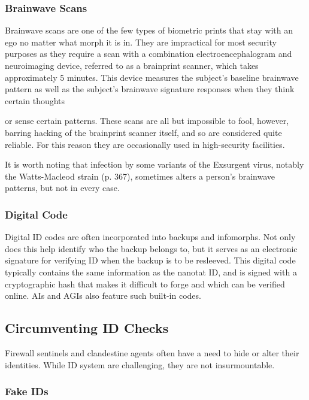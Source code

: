 \subsubsection{Brainwave Scans} 

Brainwave scans are one of the few types of biometric prints that stay with an ego no matter what morph it is in. They are impractical for most security purposes as they require a scan with a combination electroencephalogram and neuroimaging device, referred to as a brainprint scanner, which takes approximately 5 minutes. This device measures the subject's baseline brainwave pattern as well as the subject's brainwave signature responses when they think certain thoughts 

or sense certain patterns. These scans are all but impossible to fool, however, barring hacking of the brainprint scanner itself, and so are considered quite reliable. For this reason they are occasionally used in high-security facilities. 

It is worth noting that infection by some variants of the Exsurgent virus, notably the Watts-Macleod strain (p. 367), sometimes alters a person's brainwave patterns, but not in every case. 

\subsubsection{Digital Code} 

Digital ID codes are often incorporated into backups and infomorphs. Not only does this help identify who the backup belongs to, but it serves as an electronic signature for verifying ID when the backup is to be resleeved. This digital code typically contains the same information as the nanotat ID, and is signed with a cryptographic hash that makes it difficult to forge and which can be verified online. AIs and AGIs also feature such built-in codes. 

\subsection{Circumventing ID Checks} 

Firewall sentinels and clandestine agents often have a need to hide or alter their identities. While ID system are challenging, they are not insurmountable. 

\subsubsection{Fake IDs} 

